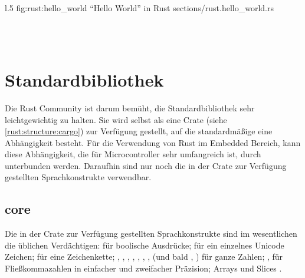 \begin{wrapfigure}{l}{.5\textwidth}
	\rustcinclude
		{fig:rust:hello_world}
		{\enquote{Hello World} in Rust}
		{sections/rust.hello_world.rs}
\end{wrapfigure}





 \\

 \\
\cite{rust:orly_programming}

\clearpage

\section{Standardbibliothek}

Die Rust Community ist darum bemüht, die Standardbibliothek sehr leichtgewichtig zu halten.
Sie wird selbst als eine Crate (siehe \autoref{rust:structure:cargo}) zur Verfügung gestellt, auf die standardmäßige eine Abhängigkeit besteht.
Für die Verwendung von Rust im Embedded Bereich, kann diese Abhängigkeit, die für Microcontroller sehr umfangreich ist, durch \rustcinline{#![no_std]} unterbunden werden.
Daraufhin sind nur noch die in der  Crate zur Verfügung gestellten Sprachkonstrukte verwendbar.

\subsection{core}
\label{rust:core}
Die in der  Crate zur Verfügung gestellten Sprachkonstrukte sind im wesentlichen die üblichen  Verdächtigen:  für boolische Ausdrücke;  für ein einzelnes Unicode Zeichen;  für eine Zeichenkette; , , , , , , ,  (und bald ,  ) für ganze Zahlen; ,  für Fließkommazahlen in einfacher und zweifacher Präzision; Arrays und Slices \cite{rust:book:primitives}.


